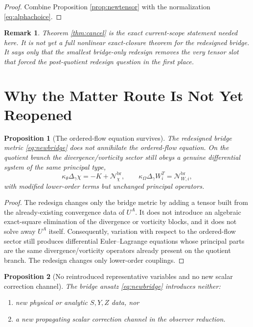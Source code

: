 \documentclass[11pt]{article}
\newtheorem{proposition}{Proposition}
\newtheorem{remark}{Remark}
\begin{document}
\begin{proof}
Combine Proposition \ref{prop:newtensor} with the normalization \eqref{eq:alphachoice}.
\end{proof}

\begin{remark}
Theorem \ref{thm:cancel} is the exact current-scope statement needed here. It is not yet a full nonlinear exact-closure theorem for the redesigned bridge. It says only that the smallest bridge-only redesign removes the very tensor slot that forced the post-quotient redesign question in the first place.
\end{remark}

\section{Why the Matter Route Is Not Yet Reopened}

\begin{proposition}[The ordered-flow equation survives]
\label{prop:survives}
The redesigned bridge metric \eqref{eq:newbridge} does not annihilate the ordered-flow equation. On the quotient branch the divergence/vorticity sector still obeys a genuine differential system of the same principal type,
\begin{equation}
\kappa_\theta \Delta_\gamma \chi = -K + \mathcal N_\chi^{\mathrm{br}},
\qquad
\kappa_\Omega \Delta_\gamma W_i^T = \mathcal N_{W,i}^{\mathrm{br}},
\label{eq:survive}
\end{equation}
with modified lower-order terms but unchanged principal operators.
\end{proposition}

\begin{proof}
The redesign changes only the bridge metric by adding a tensor built from the already-existing convergence data of \(U^A\). It does not introduce an algebraic exact-square elimination of the divergence or vorticity blocks, and it does not solve away \(U^A\) itself. Consequently, variation with respect to the ordered-flow sector still produces differential Euler--Lagrange equations whose principal parts are the same divergence/vorticity operators already present on the quotient branch. The redesign changes only lower-order couplings.
\end{proof}

\begin{proposition}[No reintroduced representative variables and no new scalar correction channel]
\label{prop:hygiene}
The bridge ansatz \eqref{eq:newbridge} introduces neither:
\begin{enumerate}
    \item new physical or analytic \(S,Y,Z\) data, nor
    \item a new propagating scalar correction channel in the observer reduction.
\end{enumerate}
\end{proposition}
\end{document}
